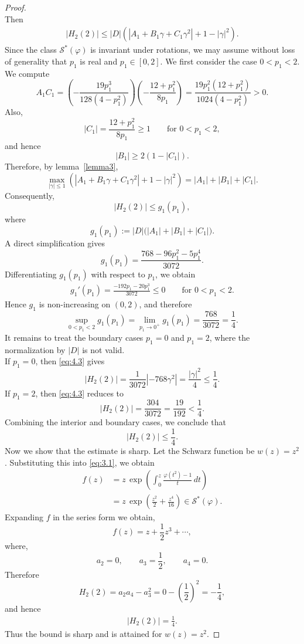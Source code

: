 \documentclass[a4paper,12pt,reqno]{amsart} %
\numberwithin{equation}{section}
\theoremstyle{definition}
\begin{document}
\begin{proof}
\[\]
Then
\begin{align*}
|H_2(2)|
\le
|D|\left(
|A_1+B_1\gamma+C_1\gamma^2|+1-|\gamma|^2
\right).
\end{align*}
Since the class $\mathcal{S}^*(\varphi)$ is invariant under rotations, we may assume without loss of generality that \(p_1\) is real and \(p_1\in[0,2]\). We first consider the case \(0<p_1<2\). We compute
\[
A_1C_1
=
\left(-\frac{19p_1^3}{128(4-p_1^2)}\right)
\left(-\frac{12+p_1^2}{8p_1}\right)
=
\frac{19p_1^2(12+p_1^2)}{1024(4-p_1^2)}
>0.
\]
Also,
\[
|C_1|=\frac{12+p_1^2}{8p_1}\ge 1
\qquad \text{for } 0<p_1<2,
\]
and hence
\[
|B_1|\ge 2(1-|C_1|).
\]
Therefore, by lemma~\ref{lemma3},
\[
\max_{|\gamma|\le 1}
\left(
|A_1+B_1\gamma+C_1\gamma^2|+1-|\gamma|^2
\right)
=
|A_1|+|B_1|+|C_1|.
\]
Consequently,
\[
|H_2(2)|\le g_1(p_1),
\]
where
\[
g_1(p_1):=|D|\bigl(|A_1|+|B_1|+|C_1|\bigr).
\]
A direct simplification gives
\[
g_1(p_1)=\frac{768-96p_1^2-5p_1^4}{3072}.
\]
Differentiating $g_{1}(p_{1})$ with respect to $p_{1}$, we obtain
\begin{align*}
g_1'(p_1)=\frac{-192p_1-20p_1^3}{3072}\le 0
\qquad \text{for } 0<p_1<2.
\end{align*}
Hence \(g_1\) is non-increasing on \((0,2)\), and therefore
\[
\sup_{0<p_1<2} g_1(p_1)
=
\lim_{p_1\to 0^+} g_1(p_1)
=
\frac{768}{3072}
=
\frac{1}{4}.
\]
It remains to treat the boundary cases $p_1=0$ and $p_1=2$, where the normalization by $|D|$ is not valid.\\[2mm]
If $p_1=0$, then \eqref{eq:4.3} gives
\[
|H_2(2)|
=
\frac{1}{3072}|-768\gamma^2|
=
\frac{|\gamma|^2}{4}
\le \frac{1}{4}.
\]
If $p_1=2$, then \eqref{eq:4.3} reduces to
\[
|H_2(2)|
=
\frac{304}{3072}
=
\frac{19}{192}
<
\frac{1}{4}.
\]
Combining the interior and boundary cases, we conclude that
\[
|H_2(2)|\le \frac{1}{4}.
\]
Now we show that the estimate is sharp. Let the Schwarz function be \(w(z)=z^2\). Substituting this into \eqref{eq:3.1}, we obtain
\begin{align*}
f(z)
&= z\, \exp\!\left( \int_{0}^{z} \frac{\varphi(t^{2}) - 1}{t}\, dt \right) \\[2mm]
&= z\, \exp{\!\left(\frac{z^{2}}{2}+\frac{z^{4}}{16}\right)}
\in \mathcal{S}^{*}(\varphi).
\end{align*}
Expanding $f$ in the series form we obtain, 
\[
f(z)=z+\frac{1}{2}z^3+\cdots,
\]
where, 
\[
a_2=0,\qquad a_3=\frac12,\qquad a_4=0.
\]
Therefore
\[
H_2(2)=a_2a_4-a_3^2=0-\left(\frac12\right)^2=-\frac14,
\]
and hence
\begin{align*}
|H_2(2)|=\frac14.
\end{align*}
Thus the bound is sharp and is attained for $w(z)=z^2$.
\end{proof}
\end{document}
